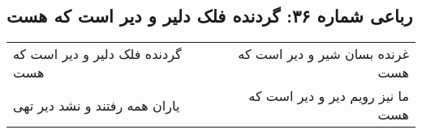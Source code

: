 \begin{center}
\section*{رباعی شماره ۳۶: گردنده فلک دلیر و دیر است که هست}
\label{sec:036}
\begin{longtable}{l p{0.5cm} r}
گردنده فلک دلیر و دیر است که هست
&&
غرنده بسان شیر و دیر است که هست
\\
یاران همه رفتند و نشد دیر تهی
&&
ما نیز رویم دیر و دیر است که هست
\\
\end{longtable}
\end{center}
